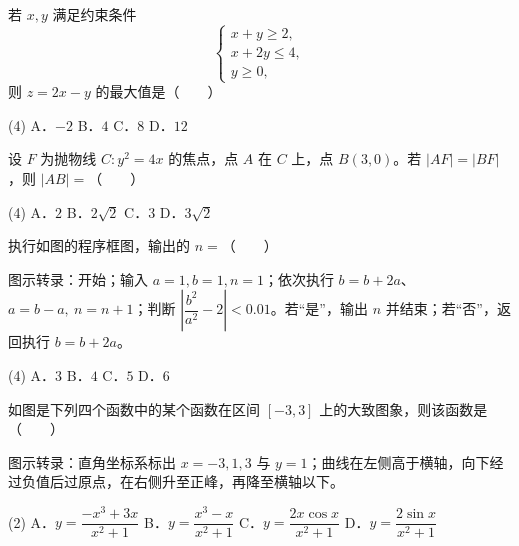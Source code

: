 \begin{question}
若 $x,y$ 满足约束条件
\nopagebreak[4]
\[
\begin{cases}
x+y\ge 2,\\
x+2y\le 4,\\
y\ge 0,
\end{cases}
\]
则 $z=2x-y$ 的最大值是\mbox{（　　）}

\begin{gkopts}(4)
\task A．$-2$
\task B．$4$
\task C．$8$
\task D．$12$
\end{gkopts}

\end{question}
\begin{question}
设 $F$ 为抛物线 $C:y^2=4x$ 的焦点，点 $A$ 在 $C$ 上，点 $B(3,0)$。若 $\lvert AF\rvert=\lvert BF\rvert$，则 $\lvert AB\rvert=$\mbox{（　　）}

\begin{gkopts}(4)
\task A．$2$
\task B．$2\sqrt2$
\task C．$3$
\task D．$3\sqrt2$
\end{gkopts}

\Needspace{0.4\textheight}
\end{question}
\begin{question}
执行如图的程序框图，输出的 $n=$\mbox{（　　）}

图示转录：开始；输入 $a=1,b=1,n=1$；依次执行 $b=b+2a$、$a=b-a,\ n=n+1$；判断 $\left|\dfrac{b^2}{a^2}-2\right|<0.01$。若“是”，输出 $n$ 并结束；若“否”，返回执行 $b=b+2a$。
\nopagebreak[4]
\begin{center}\end{center}
\nopagebreak[4]
\begin{gkopts}(4)
\task A．$3$
\task B．$4$
\task C．$5$
\task D．$6$
\end{gkopts}

\Needspace{0.4\textheight}
\end{question}
\begin{question}
如图是下列四个函数中的某个函数在区间 $[-3,3]$ 上的大致图象，则该函数是\mbox{（　　）}

图示转录：直角坐标系标出 $x=-3,1,3$ 与 $y=1$；曲线在左侧高于横轴，向下经过负值后过原点，在右侧升至正峰，再降至横轴以下。
\nopagebreak[4]
\begin{center}\end{center}
\nopagebreak[4]
\begin{gkopts}(2)
\task A．$y=\dfrac{-x^3+3x}{x^2+1}$
\task B．$y=\dfrac{x^3-x}{x^2+1}$
\task C．$y=\dfrac{2x\cos x}{x^2+1}$
\task D．$y=\dfrac{2\sin x}{x^2+1}$
\end{gkopts}

\end{question}

